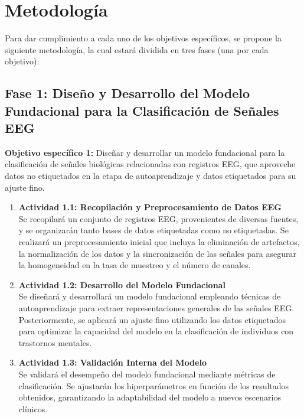 \section{Metodología}

Para dar cumplimiento a cada uno de los objetivos específicos, se propone la siguiente metodología, la cual estará dividida en tres fases (una por cada objetivo):

\subsection*{Fase 1: Diseño y Desarrollo del Modelo Fundacional para la Clasificación de Señales EEG}
\textbf{Objetivo específico 1:} Diseñar y desarrollar un modelo fundacional para la clasificación de señales biológicas relacionadas con registros EEG, que aproveche datos no etiquetados en la etapa de autoaprendizaje y datos etiquetados para su ajuste fino.

\begin{enumerate}
	\item \textbf{Actividad 1.1: Recopilación y Preprocesamiento de Datos EEG}\\
	Se recopilará un conjunto de registros EEG, provenientes de diversas fuentes, y se organizarán tanto bases de datos etiquetadas como no etiquetadas. Se realizará un preprocesamiento inicial que incluya la eliminación de artefactos, la normalización de los datos y la sincronización de las señales para asegurar la homogeneidad en la tasa de muestreo y el número de canales.
	
	\item \textbf{Actividad 1.2: Desarrollo del Modelo Fundacional}\\
	Se diseñará y desarrollará un modelo fundacional empleando técnicas de autoaprendizaje para extraer representaciones generales de las señales EEG. Posteriormente, se aplicará un ajuste fino utilizando los datos etiquetados para optimizar la capacidad del modelo en la clasificación de individuos con trastornos mentales.
	
	\item \textbf{Actividad 1.3: Validación Interna del Modelo}\\
	Se validará el desempeño del modelo fundacional mediante métricas de clasificación. Se ajustarán los hiperparámetros en función de los resultados obtenidos, garantizando la adaptabilidad del modelo a nuevos escenarios clínicos.
\end{enumerate}

